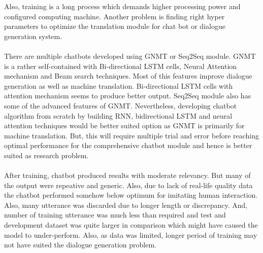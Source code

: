 \documentclass[a4paper,12pt]{report}
\begin{document}
Also, training is a long process which demands higher processing power and configured computing machine. Another problem is finding right hyper parameters to optimize the translation module for chat bot or dialogue generation system.\\\\
There are multiple chatbots developed using GNMT or Seq2Seq module. GNMT is a rather self-contained with Bi-directional LSTM cells, Neural Attention mechanism and Beam search techniques. Most of this features improve dialogue generation as well as machine translation. Bi-directional LSTM cells with attention mechanism seems to produce better output. Seq2Seq module also has some of the advanced features of GNMT. Nevertheless, developing chatbot algorithm from scratch by building RNN, bidirectional LSTM and neural attention techniques would be better suited option as GNMT is primarily for machine translation. But, this will require multiple trial and error before reaching optimal performance for the comprehensive chatbot module and hence is better suited as research problem.\\\\
After training, chatbot produced results with moderate relevancy. But many of the output were repeative and generic. Also, due to lack of real-life quality data the chatbot performed somehow below optimum for imitating human interaction. Also, many utterance was discarded due to longer length or discrepancy. And, number of training utterance was much less than required and test and development dataset was quite larger in comparison which might have caused the model to under-perform. Also, as data was limited, longer period of training may not have suited the dialogue generation problem.\\\\
\end{document}
